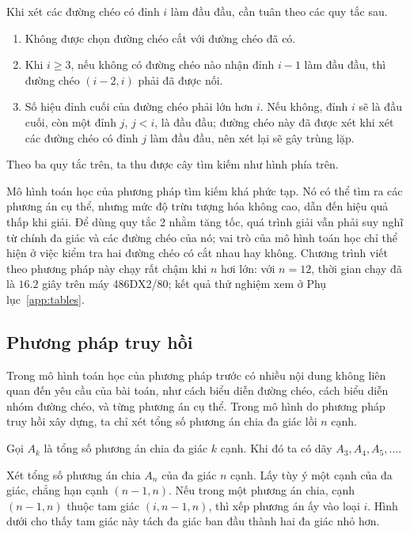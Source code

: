 \documentclass[11pt]{article}
\begin{document}
Khi xét các đường chéo có đỉnh \(i\) làm đầu đầu, cần tuân theo các quy tắc
sau.
\begin{enumerate}
  \item Không được chọn đường chéo cắt với đường chéo đã có.
  \item Khi \(i\ge 3\), nếu không có đường chéo nào nhận đỉnh \(i-1\) làm đầu
  đầu, thì đường chéo \((i-2,i)\) phải đã được nối.
  \item Số hiệu đỉnh cuối của đường chéo phải lớn hơn \(i\). Nếu không, đỉnh
  \(i\) sẽ là đầu cuối, còn một đỉnh \(j\), \(j<i\), là đầu đầu; đường chéo
  này đã được xét khi xét các đường chéo có đỉnh \(j\) làm đầu đầu, nên xét
  lại sẽ gây trùng lặp.
\end{enumerate}

Theo ba quy tắc trên, ta thu được cây tìm kiếm như hình phía trên.

Mô hình toán học của phương pháp tìm kiếm khá phức tạp. Nó có thể tìm ra các
phương án cụ thể, nhưng mức độ trừu tượng hóa không cao, dẫn đến hiệu quả
thấp khi giải. Để dùng quy tắc 2 nhằm tăng tốc, quá trình giải vẫn phải suy
nghĩ từ chính đa giác và các đường chéo của nó; vai trò của mô hình toán học
chỉ thể hiện ở việc kiểm tra hai đường chéo có cắt nhau hay không. Chương
trình viết theo phương pháp này chạy rất chậm khi \(n\) hơi lớn: với
\(n=12\), thời gian chạy đã là \(16.2\) giây trên máy 486DX2/80; kết quả thử
nghiệm xem ở Phụ lục~\ref{app:tables}.

\subsection{Phương pháp truy hồi}

Trong mô hình toán học của phương pháp trước có nhiều nội dung không liên quan
đến yêu cầu của bài toán, như cách biểu diễn đường chéo, cách biểu diễn nhóm
đường chéo, và từng phương án cụ thể. Trong mô hình do phương pháp truy hồi
xây dựng, ta chỉ xét tổng số phương án chia đa giác lồi \(n\) cạnh.

Gọi \(A_k\) là tổng số phương án chia đa giác \(k\) cạnh. Khi đó ta có dãy
\(A_3,A_4,A_5,\ldots\).

Xét tổng số phương án chia \(A_n\) của đa giác \(n\) cạnh. Lấy tùy ý một cạnh
của đa giác, chẳng hạn cạnh \((n-1,n)\). Nếu trong một phương án chia, cạnh
\((n-1,n)\) thuộc tam giác \((i,n-1,n)\), thì xếp phương án ấy vào loại \(i\).
Hình dưới cho thấy tam giác này tách đa giác ban đầu thành hai đa giác nhỏ
hơn.
\end{document}
